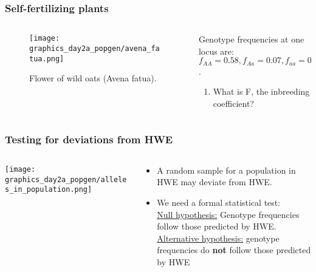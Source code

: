 \documentclass{beamer}
\newcommand{\1}{\ensuremath{\mathbf{1}}}
\begin{document}
\begin{frame}\frametitle{Self-fertilizing plants}
	\begin{columns}
	\begin{column}{.45\textwidth}
		\begin{figure}
		\begin{center}
			\texttt{[image: graphics\_day2a\_popgen/avena\_fatua.png]}
		\end{center}
		\caption{Flower of wild oats (Avena fatua).}
		\end{figure}
	\end{column}
	\begin{column}{.55\textwidth}
		Genotype frequencies at one locus are:\\
		$f_{AA} = 0.58, f_{Aa} = 0.07, f_{aa} = 0.35$.
		\begin{enumerate}
			\item What is F, the inbreeding coefficient?\\
		\end{enumerate}
	\end{column}
	\end{columns}
\end{frame}
%
%
%
\begin{frame}\frametitle{Testing for deviations from HWE}
	\begin{columns}
	\begin{column}{.3\textwidth}
		\begin{center}
		\texttt{[image: graphics\_day2a\_popgen/alleles\_in\_population.png]}
		\end{center}
	\end{column}
	\begin{column}{.7\textwidth}
		\begin{itemize}
			\item A random sample for a population in HWE may deviate from HWE.
			\item We need a formal statistical test:\\[1.5ex]
				\underline{Null hypothesis:} Genotype frequencies follow those predicted by HWE.\\[1.5ex]
				\underline{Alternative hypothesis:} genotype frequencies do \textbf{not} follow those predicted by HWE
		\end{itemize}
	\end{column}
	\end{columns}
\end{frame}
\end{document}
